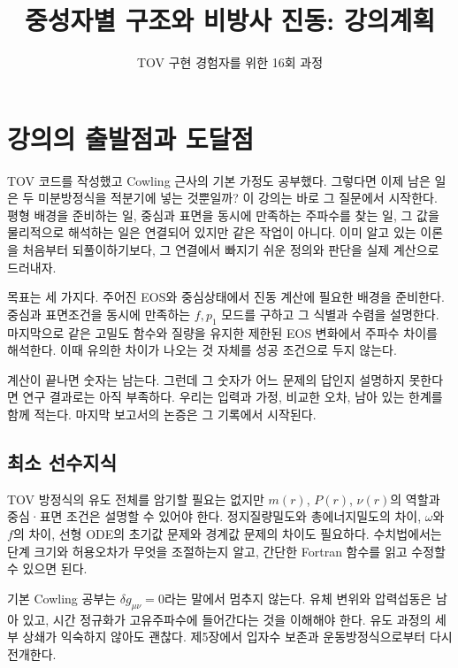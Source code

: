 \documentclass[
  10pt,
  a4paper,
]{article}
\title{중성자별 구조와 비방사 진동: 강의계획}
\subtitle{TOV 구현 경험자를 위한 16회 과정}
\author{}
\date{}
\begin{document}
\maketitle

{
\hypersetup{linkcolor=}
\setcounter{tocdepth}{3}
\tableofcontents
}
\section{강의의 출발점과
도달점}\label{uxac15uxc758uxc758-uxcd9cuxbc1cuxc810uxacfc-uxb3c4uxb2ecuxc810}

TOV 코드를 작성했고 Cowling 근사의 기본 가정도 공부했다. 그렇다면 이제
남은 일은 두 미분방정식을 적분기에 넣는 것뿐일까? 이 강의는 바로 그
질문에서 시작한다. 평형 배경을 준비하는 일, 중심과 표면을 동시에
만족하는 주파수를 찾는 일, 그 값을 물리적으로 해석하는 일은 연결되어
있지만 같은 작업이 아니다. 이미 알고 있는 이론을 처음부터
되풀이하기보다, 그 연결에서 빠지기 쉬운 정의와 판단을 실제 계산으로
드러내자.

목표는 세 가지다. 주어진 EOS와 중심상태에서 진동 계산에 필요한 배경을
준비한다. 중심과 표면조건을 동시에 만족하는 \(f,p_1\) 모드를 구하고 그
식별과 수렴을 설명한다. 마지막으로 같은 고밀도 함수와 질량을 유지한
제한된 EOS 변화에서 주파수 차이를 해석한다. 이때 유의한 차이가 나오는 것
자체를 성공 조건으로 두지 않는다.

계산이 끝나면 숫자는 남는다. 그런데 그 숫자가 어느 문제의 답인지
설명하지 못한다면 연구 결과로는 아직 부족하다. 우리는 입력과 가정,
비교한 오차, 남아 있는 한계를 함께 적는다. 마지막 보고서의 논증은 그
기록에서 시작된다.

\subsection{최소 선수지식}\label{uxcd5cuxc18c-uxc120uxc218uxc9c0uxc2dd}

TOV 방정식의 유도 전체를 암기할 필요는 없지만 \(m(r)\), \(P(r)\),
\(\nu(r)\)의 역할과 중심·표면 조건은 설명할 수 있어야 한다.
정지질량밀도와 총에너지밀도의 차이, \(\omega\)와 \(f\)의 차이, 선형
ODE의 초기값 문제와 경계값 문제의 차이도 필요하다. 수치법에서는 단계
크기와 허용오차가 무엇을 조절하는지 알고, 간단한 Fortran 함수를 읽고
수정할 수 있으면 된다.

기본 Cowling 공부는 \(\delta g_{\mu\nu}=0\)라는 말에서 멈추지 않는다.
유체 변위와 압력섭동은 남아 있고, 시간 정규화가 고유주파수에 들어간다는
것을 이해해야 한다. 유도 과정의 세부 상쇄가 익숙하지 않아도 괜찮다.
제5장에서 입자수 보존과 운동방정식으로부터 다시 전개한다.
\end{document}
